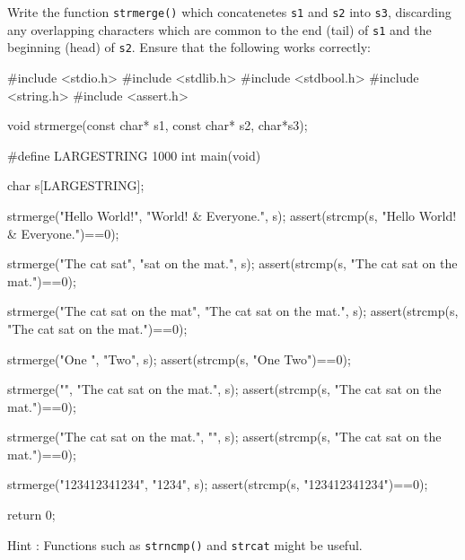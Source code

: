 
\toohard 

\begin{exercise}
Write the function \verb^strmerge()^ which concatenetes \verb^s1^ and \verb^s2^ into \verb^s3^,
discarding any overlapping characters which are common to the end (tail) of \verb^s1^ and the 
beginning (head) of \verb^s2^.
Ensure that the following
works correctly:
\begin{codesnippet}
#include <stdio.h>
#include <stdlib.h>
#include <stdbool.h>
#include <string.h>
#include <assert.h>

void strmerge(const char* s1, const char* s2, char*s3);

#define LARGESTRING 1000
int main(void)
{

   char s[LARGESTRING];

   strmerge("Hello World!", "World! & Everyone.", s);
   assert(strcmp(s, "Hello World! & Everyone.")==0);

   strmerge("The cat sat", "sat on the mat.", s);
   assert(strcmp(s, "The cat sat on the mat.")==0);

   strmerge("The cat sat on the mat", "The cat sat on the mat.", s);
   assert(strcmp(s, "The cat sat on the mat.")==0);

   strmerge("One ", "Two", s);
   assert(strcmp(s, "One Two")==0);

   strmerge("", "The cat sat on the mat.", s);
   assert(strcmp(s, "The cat sat on the mat.")==0);

   strmerge("The cat sat on the mat.", "", s);
   assert(strcmp(s, "The cat sat on the mat.")==0);

   strmerge("123412341234", "1234", s);
   assert(strcmp(s, "123412341234")==0);

   return 0;
}
\end{codesnippet}
Hint : Functions such as \verb^strncmp()^ and \verb^strcat^ might be useful.
\end{exercise}
